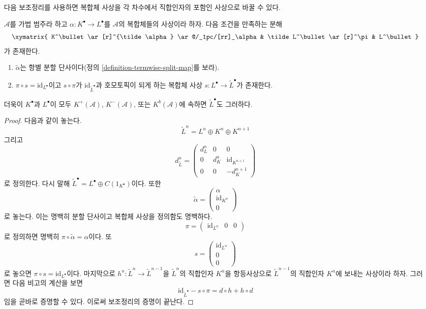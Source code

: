 \noindent
다음 보조정리를 사용하면 복합체 사상을 각 차수에서 직합인자의
포함인 사상으로 바꿀 수 있다.

\begin{lemma}
\label{lemma-make-injective}
$\mathcal{A}$를 가법 범주라 하고
$\alpha : K^\bullet \to L^\bullet$를 $\mathcal{A}$의 복합체들의
사상이라 하자. 다음 조건을 만족하는 분해
$$
\xymatrix{
K^\bullet \ar[r]^{\tilde \alpha} \ar@/_1pc/[rr]_\alpha &
\tilde L^\bullet \ar[r]^\pi &
L^\bullet
}
$$
가 존재한다.
\begin{enumerate}
\item $\tilde \alpha$는 항별 분할 단사이다(정의
\ref{definition-termwise-split-map}를 보라).
\item $\pi \circ s = \text{id}_{L^\bullet}$이고
$s \circ \pi$가 $\text{id}_{\tilde L^\bullet}$과 호모토픽이 되게 하는
복합체 사상 $s : L^\bullet \to \tilde L^\bullet$가 존재한다.
\end{enumerate}
더욱이 $K^\bullet$과 $L^\bullet$이 모두
$K^{+}(\mathcal{A})$, $K^{-}(\mathcal{A})$, 또는 $K^b(\mathcal{A})$에
속하면 $\tilde L^\bullet$도 그러하다.
\end{lemma}

\begin{proof}
다음과 같이 놓는다.
$$
\tilde L^n = L^n \oplus K^n \oplus K^{n + 1}
$$
그리고
$$
d^n_{\tilde L} =
\left(
\begin{matrix}
d^n_L & 0 & 0 \\
0 & d^n_K & \text{id}_{K^{n + 1}} \\
0 & 0 & -d^{n + 1}_K
\end{matrix}
\right)
$$
로 정의한다. 다시 말해
$\tilde L^\bullet = L^\bullet \oplus C(1_{K^\bullet})$이다.
또한
$$
\tilde \alpha =
\left(
\begin{matrix}
\alpha \\
\text{id}_{K^n} \\
0
\end{matrix}
\right)
$$
로 놓는다. 이는 명백히 분할 단사이고 복합체 사상을 정의함도
명백하다.
$$
\pi =
\left(
\begin{matrix}
\text{id}_{L^n} &
0 &
0
\end{matrix}
\right)
$$
로 정의하면 명백히 $\pi \circ \tilde \alpha = \alpha$이다.
또
$$
s =
\left(
\begin{matrix}
\text{id}_{L^n} \\
0 \\
0
\end{matrix}
\right)
$$
로 놓으면 $\pi \circ s = \text{id}_{L^\bullet}$이다.
마지막으로 $h^n : \tilde L^n \to \tilde L^{n - 1}$을
$\tilde L^n$의 직합인자 $K^n$을 항등사상으로
$\tilde L^{n - 1}$의 직합인자 $K^n$에 보내는 사상이라 하자.
그러면 다음 비고의 계산을 보면
$$
\text{id}_{\tilde L^\bullet} - s \circ \pi
=
d \circ h + h \circ d
$$
임을 곧바로 증명할 수 있다. 이로써 보조정리의 증명이 끝난다.
\end{proof}

